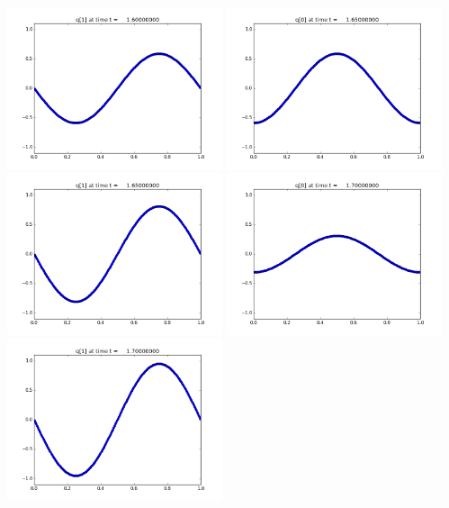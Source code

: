 \documentclass[11pt]{article}
\begin{document}
\includegraphics[width=0.475\textwidth]{frame0032fig1.png}
\vskip 10pt 
\includegraphics[width=0.475\textwidth]{frame0033fig0.png}
\includegraphics[width=0.475\textwidth]{frame0033fig1.png}
\vskip 10pt 
\includegraphics[width=0.475\textwidth]{frame0034fig0.png}
\includegraphics[width=0.475\textwidth]{frame0034fig1.png}
\end{document}
